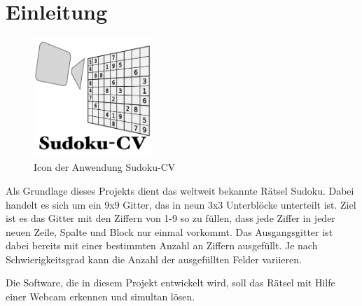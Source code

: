 
\section{Einleitung}
\label{sec:Einleitung}
%
\begin{figure}[tb]
    \begin{center}
        \includegraphics[width=0.4\textwidth]{../Resources/Icon.pdf}
    \end{center}
    \caption{Icon der Anwendung Sudoku-CV}
\end{figure}
%
Als Grundlage dieses Projekts dient das weltweit bekannte Rätsel Sudoku. Dabei handelt es sich um ein 9x9 Gitter, das in neun 3x3 Unterblöcke unterteilt ist.
Ziel ist es das Gitter mit den Ziffern von 1-9 so zu füllen, dass jede Ziffer in jeder neuen Zeile, Spalte und Block nur einmal vorkommt.
Das Ausgangsgitter ist dabei bereits mit einer bestimmten Anzahl an Ziffern ausgefüllt. Je nach Schwierigkeitsgrad kann die Anzahl der ausgefüllten Felder variieren.

Die Software, die in diesem Projekt entwickelt wird, soll das Rätsel mit Hilfe einer Webcam erkennen und simultan lösen.
